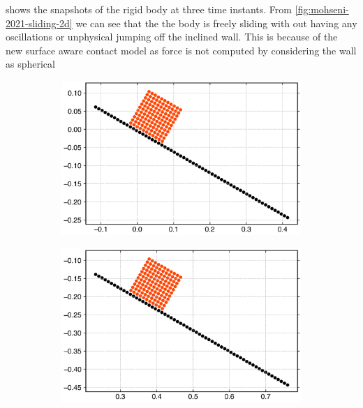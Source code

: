  shows the snapshots of the rigid body at
three time instants. From \cref{fig:mohseni-2021-sliding-2d} we can see that
the the body is freely sliding with out having any oscillations or unphysical
jumping off the inclined wall. This is because of the new surface aware
contact model as force is not computed by considering the wall as spherical
\begin{figure}[!htpb]
  \centering
  \begin{subfigure}{0.48\textwidth}
    \centering
    \includegraphics[width=1.0\textwidth]{figures/rfc/figures/mohseni_2021_free_sliding_on_a_slope_2d/fric_coeff_0_2/time0}
    \label{fig:passing-0}
  \end{subfigure}
  \begin{subfigure}{0.48\textwidth}
    \centering
    \includegraphics[width=1.0\textwidth]{figures/rfc/figures/mohseni_2021_free_sliding_on_a_slope_2d/fric_coeff_0_2/time1}
    \label{fig:passing-1}
  \end{subfigure}


\end{figure}

